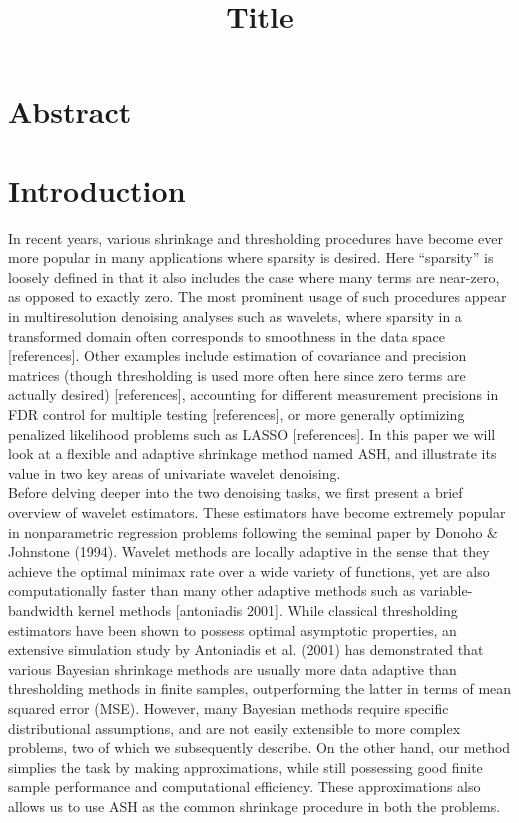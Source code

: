 \documentclass[12pt]{article}
\begin{document}
\title{\textbf{Title}}
\date{}
\maketitle

\section{Abstract}
\section{Introduction}
In recent years, various shrinkage and thresholding procedures have become ever more popular in many applications where sparsity is desired. Here ``sparsity'' is loosely defined in that it also includes the case where many terms are near-zero, as opposed to exactly zero. The most prominent usage of such procedures appear in multiresolution denoising analyses such as wavelets, where sparsity in a transformed domain often corresponds to smoothness in the data space [references]. Other examples include estimation of covariance and precision matrices (though thresholding is used more often here since zero terms are actually desired) [references], accounting for different measurement precisions in FDR control for multiple testing [references], or more generally optimizing penalized likelihood problems such as LASSO [references]. In this paper we will look at a flexible and adaptive shrinkage method named ASH, and illustrate its value in two key areas of univariate wavelet denoising.\bigskip\\
Before delving deeper into the two denoising tasks, we first present a brief overview of wavelet estimators. These estimators have become extremely popular in nonparametric regression problems following the seminal paper by Donoho \& Johnstone (1994). Wavelet methods are locally adaptive in the sense that they achieve the optimal minimax rate over a wide variety of functions, yet are also computationally faster than many other adaptive methods such as variable-bandwidth kernel methods [antoniadis 2001]. While classical thresholding estimators have been shown to possess optimal asymptotic properties, an extensive simulation study by Antoniadis et al. (2001) has demonstrated that various Bayesian shrinkage methods are usually more data adaptive than thresholding methods in finite samples, outperforming the latter in terms of mean squared error (MSE). However, many Bayesian methods require specific distributional assumptions, and are not easily extensible to more complex problems, two of which we subsequently describe. On the other hand, our method simplies the task by making approximations, while still possessing good finite sample performance and computational efficiency. These approximations also allows us to use ASH as the common shrinkage procedure in both the problems.\bigskip\\
\end{document}
